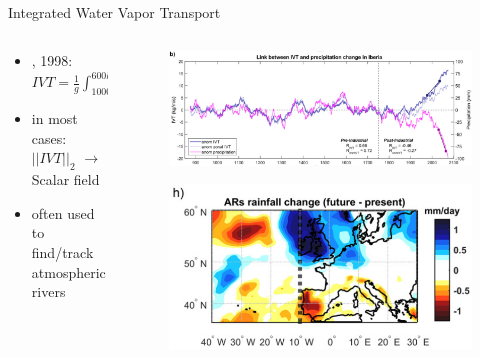 \begin{frame}{Integrated Water Vapor Transport}

 \begin{columns}
   \begin{column}{0.5\textwidth}
     \begin{itemize}
       \item \citeauthor{zhu_proposed_1998}, 1998: $IVT = \frac{1}{g}\int_{1000 hPa}^{600 hPa} q\vec{V} dp$ \cite{zhu_proposed_1998}
        \item in most cases: $||IVT||_2$ $\to$ Scalar field \cite{sousa_north_2020, jiang_impact_2017, ayantobo_integrated_2022, allan_diagnosing_2016, ralph_scale_2019, ralph_dropsonde_2017}
        \item often used to find/track atmospheric rivers 
     \end{itemize}
    
   \end{column}
   \begin{column}{0.5\textwidth}
    \begin{figure}[t]
      \centering
      \includegraphics[width=\columnwidth]{imglib/precipitation_iberian_future.png}
    \end{figure}
    
    \begin{figure}[b]
      \centering
      \includegraphics[width=.7\columnwidth]{imglib/ar_rainfall_change.png}
    \end{figure}
   \end{column}
  
 \end{columns} 
\end{frame}
